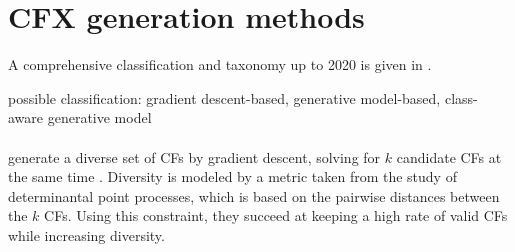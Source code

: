 \documentclass[../main.tex]{subfiles}
\begin{document}


\section{CFX generation methods}

A comprehensive classification and taxonomy up to 2020 is given in \cite{vermaCounterfactual2020}.




possible classification: gradient descent-based, generative model-based, class-aware generative model \citenote{}

\paragraph{}

\citeauthor{mothilalExplaining2020} generate a diverse set of CFs by gradient descent, solving for $k$ candidate CFs at the same time \cite{mothilalExplaining2020}.
Diversity is modeled by a metric taken from the study of determinantal point processes, which is based on the pairwise distances between the $k$ CFs.
Using this constraint, they succeed at keeping a high rate of valid CFs while increasing diversity.

\paragraph{\revise}
\label{par:revise}
\end{document}
